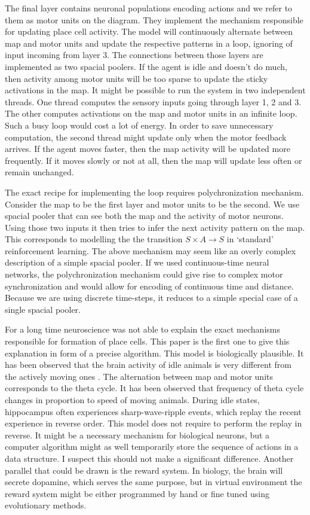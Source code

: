\documentclass[12pt]{article}
\begin{document}
The final layer contains neuronal populations encoding actions and we refer to them as motor units on the diagram.  They implement the mechanism responsible for updating place cell activity. The model will continuously alternate between map and motor units 
and update the respective patterns in a loop, ignoring of input incoming from layer 3.
The connections between those layers are implemented as two spacial poolers. If the agent is idle and doesn't do much, then activity among motor units will be too sparse to update the sticky activations in the map. It might be possible to run the system in two independent threads. One thread computes the sensory inputs going through layer 1, 2 and 3. The other computes activations on the map and motor units in an infinite loop. Such a busy loop would cost a lot of energy. In order to save unnecessary computation, the second thread might update only when the motor feedback arrives. If the agent moves faster, then the map activity will be updated more frequently. If it moves slowly or not at all, then the map will update less often or remain unchanged.

The exact recipe for implementing the loop requires polychronization mechanism.
Consider the map to be the first layer and motor units to be the second. We use spacial pooler that can see both the map and the activity of motor neurons. Using those two inputs it then tries to infer the next activity pattern on the map. This corresponds to modelling the the transition $S \times A \rightarrow S$ in `standard' reinforcement learning. The above mechanism may seem like an overly complex description of a simple spacial pooler. If we used continuous-time neural networks, the polychronization mechanism could give rise to complex motor synchronization and would allow for encoding of continuous time and distance. Because we are using discrete time-steps, it reduces to a simple special case of a single spacial pooler.

For a long time neuroscience was not able to explain the exact mechanisms responsible for formation of place cells. This paper is the first one to give this explanation in form of a precise algorithm. This model is biologically plausible. It has been observed that the brain activity of idle animals
is very different from the actively moving ones \cite{swr_correct_and_error}. The alternation between map and motor units corresponds to the theta cycle. It has been observed that frequency of theta cycle changes in proportion to speed of moving animals. During idle states, hippocampus often experiences sharp-wave-ripple events, which replay the recent experience in reverse order. This model does not require to perform the replay in reverse. It might be a necessary mechanism for biological neurons, but a computer algorithm might as well temporarily store the sequence of actions in a data structure. I suspect this should not make a significant difference. Another parallel that could be drawn is the reward system. In biology, the brain will secrete dopamine, which serves the same purpose, but in virtual environment the reward system might be either programmed by hand or fine tuned using evolutionary methods.  
\end{document}
